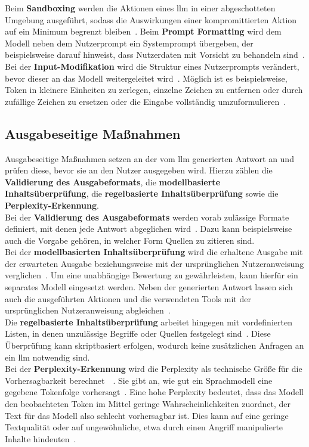 Beim \textbf{Sandboxing} werden die Aktionen eines \ac{llm} in einer abgeschotteten Umgebung ausgeführt, sodass die Auswirkungen einer kompromittierten Aktion auf ein Minimum
begrenzt bleiben~\cite[4]{sm08}. Beim \textbf{Prompt Formatting} wird dem Modell neben dem Nutzerprompt ein Systemprompt übergeben, der beispielsweise darauf hinweist, dass
Nutzerdaten mit Vorsicht zu behandeln sind~\cite[9]{sm10}.
Bei der \textbf{Input-Modifikation} wird die Struktur eines Nutzerprompts verändert, bevor dieser an das Modell weitergeleitet wird~\cite[9]{sm10}. Möglich ist es beispielsweise,
Token in kleinere Einheiten zu zerlegen, einzelne Zeichen zu entfernen oder durch zufällige Zeichen zu ersetzen oder die Eingabe vollständig umzuformulieren~\cite[6]{sm11}.

\subsection{Ausgabeseitige Maßnahmen}

Ausgabeseitige Maßnahmen setzen an der vom \ac{llm} generierten Antwort an und prüfen diese, bevor sie an den Nutzer ausgegeben wird. Hierzu zählen die 
\textbf{Validierung des Ausgabeformats}, die \textbf{modellbasierte Inhaltsüberprüfung}, die \textbf{regelbasierte Inhaltsüberprüfung} sowie die \textbf{Perplexity-Erkennung}. \\
Bei der \textbf{Validierung des Ausgabeformats} werden vorab zulässige Formate definiert, mit denen jede Antwort abgeglichen wird~\cite{pi15}. Dazu kann beispielsweise auch die Vorgabe
gehören, in welcher Form Quellen zu zitieren sind. \\
Bei der \textbf{modellbasierten Inhaltsüberprüfung} wird die erhaltene Ausgabe mit der erwarteten Ausgabe beziehungsweise mit der ursprünglichen Nutzeranweisung verglichen~\cite[55]{pi1}.
Um eine unabhängige Bewertung zu gewährleisten, kann hierfür ein separates Modell eingesetzt werden. Neben der generierten Antwort lassen sich auch die ausgeführten
Aktionen und die verwendeten Tools mit der ursprünglichen Nutzeranweisung abgleichen~\cite[7]{sm09}. \\
Die \textbf{regelbasierte Inhaltsüberprüfung} arbeitet hingegen mit vordefinierten Listen, in denen unzulässige Begriffe oder Quellen festgelegt sind~\cite[55]{pi1}. Diese
Überprüfung kann skriptbasiert erfolgen, wodurch keine zusätzlichen Anfragen an ein \ac{llm} notwendig sind. \\
Bei der \textbf{Perplexity-Erkennung} wird die Perplexity als technische Größe für die Vorhersagbarkeit berechnet~\cite[6]{sm11}~\cite{sm47}. 
Sie gibt an, wie gut ein Sprachmodell eine gegebene Tokenfolge vorhersagt~\cite{sm13}.
Eine hohe Perplexity bedeutet, dass das Modell den beobachteten Token im Mittel geringe Wahrscheinlichkeiten zuordnet, der Text für das Modell also schlecht
vorhersagbar ist. Dies kann auf eine geringe Textqualität oder auf ungewöhnliche, etwa durch einen Angriff manipulierte Inhalte hindeuten~\cite{sm13}. 

